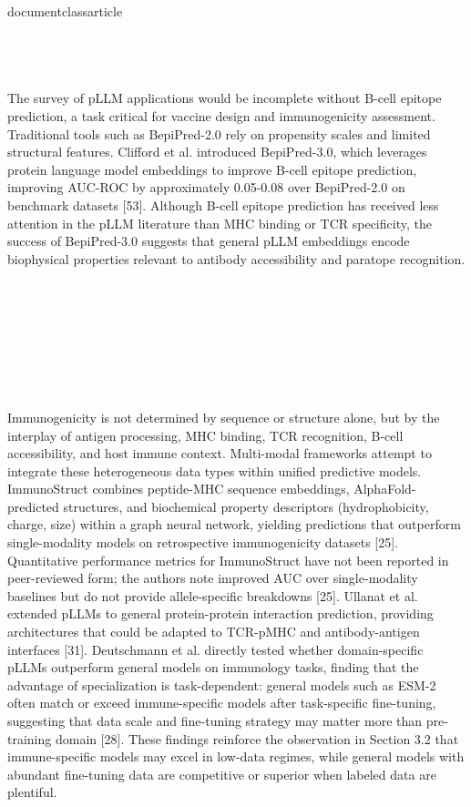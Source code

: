 \\documentclass{article}
\begin{document}
\subsection{}

The survey of pLLM applications would be incomplete without B-cell epitope prediction, a task critical for vaccine design and immunogenicity assessment. Traditional tools such as BepiPred-2.0 rely on propensity scales and limited structural features. Clifford et al. introduced BepiPred-3.0, which leverages protein language model embeddings to improve B-cell epitope prediction, improving AUC-ROC by approximately 0.05-0.08 over BepiPred-2.0 on benchmark datasets [53]. Although B-cell epitope prediction has received less attention in the pLLM literature than MHC binding or TCR specificity, the success of BepiPred-3.0 suggests that general pLLM embeddings encode biophysical properties relevant to antibody accessibility and paratope recognition.

\section{}

\subsection{}

Immunogenicity is not determined by sequence or structure alone, but by the interplay of antigen processing, MHC binding, TCR recognition, B-cell accessibility, and host immune context. Multi-modal frameworks attempt to integrate these heterogeneous data types within unified predictive models. ImmunoStruct combines peptide-MHC sequence embeddings, AlphaFold-predicted structures, and biochemical property descriptors (hydrophobicity, charge, size) within a graph neural network, yielding predictions that outperform single-modality models on retrospective immunogenicity datasets [25]. Quantitative performance metrics for ImmunoStruct have not been reported in peer-reviewed form; the authors note improved AUC over single-modality baselines but do not provide allele-specific breakdowns [25]. Ullanat et al. extended pLLMs to general protein-protein interaction prediction, providing architectures that could be adapted to TCR-pMHC and antibody-antigen interfaces [31]. Deutschmann et al. directly tested whether domain-specific pLLMs outperform general models on immunology tasks, finding that the advantage of specialization is task-dependent: general models such as ESM-2 often match or exceed immune-specific models after task-specific fine-tuning, suggesting that data scale and fine-tuning strategy may matter more than pre-training domain [28]. These findings reinforce the observation in Section 3.2 that immune-specific models may excel in low-data regimes, while general models with abundant fine-tuning data are competitive or superior when labeled data are plentiful.
\end{document}
